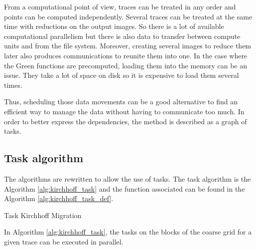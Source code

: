 From a computational point of view, traces can be treated in any order and points can be computed independently.
Several traces can be treated at the same time with reductions on the output images.
So there is a lot of available computational parallelism but there is also data to transfer between compute units and from the file system.
Moreover, creating several images to reduce them later also produces communications to reunite them into one.
In the case where the Green functions are precomputed, loading them into the memory can be an issue.
They take a lot of space on disk so it is expensive to load them several times.

Thus, scheduling those data movements can be a good alternative to find an efficient way to manage the data without having to communicate too much.
In order to better express the dependencies, the method is described as a graph of tasks.

\subsection{Task algorithm}

The algorithms are rewritten to allow the use of tasks.
The task algorithm is the Algorithm \ref{alg:kirchhoff_task} and the function associated can be found in the Algorithm \ref{alg:kirchhoff_task_def}.

\begin{algorithm}[h]
	\DontPrintSemicolon
	\SetAlgoVlined
	\caption{Task Kirchhoff Migration \label{alg:kirchhoff_task}}
\end{algorithm}

In Algorithm \ref{alg:kirchhoff_task}, the tasks on the blocks of the coarse grid for a given trace can be executed in parallel.

